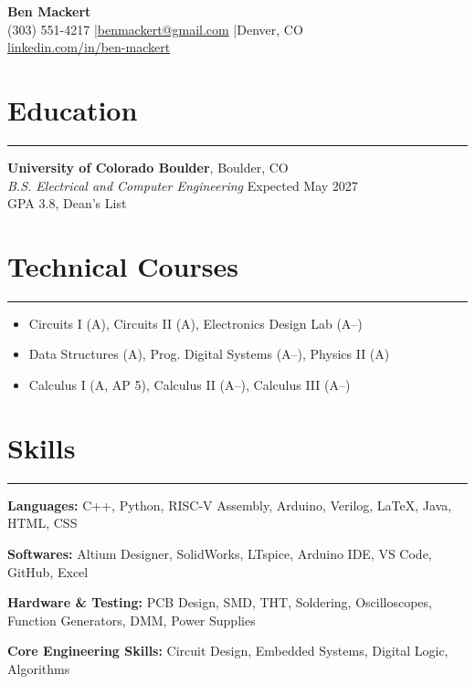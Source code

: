 \documentclass[10pt]{article}
\newcommand{\sectionline}{\vspace{0.2em}\hrule\vspace{0.4em}}
\begin{document}
\thispagestyle{empty}

\begin{center}
  {\LARGE \textbf{Ben Mackert}}\\
  (303) 551-4217 \quad|\quad \href{mailto:benmackert@gmail.com}{benmackert@gmail.com} \quad|\quad Denver, CO\\
  \href{https://www.linkedin.com/in/ben-mackert/}{linkedin.com/in/ben-mackert}
\end{center}

\section*{Education}
\sectionline

\textbf{University of Colorado Boulder}, Boulder, CO\\
\textit{B.S. Electrical and Computer Engineering} \hfill Expected May 2027\\
GPA 3.8, Dean’s List

\section*{Technical Courses}
\sectionline

\begin{itemize}[leftmargin=*]
  \item Circuits I (A), Circuits II (A), Electronics Design Lab (A–)
  \item Data Structures (A), Prog. Digital Systems (A–), Physics II (A)
  \item Calculus I (A, AP 5), Calculus II (A–), Calculus III (A–)
\end{itemize}


\section*{Skills}
\sectionline

\textbf{Languages:} C++, Python, RISC-V Assembly, Arduino, Verilog, LaTeX, Java, HTML, CSS

\textbf{Softwares:} Altium Designer, SolidWorks, LTspice, Arduino IDE, VS Code, GitHub, Excel

\textbf{Hardware \& Testing:} PCB Design, SMD, THT, Soldering, Oscilloscopes, Function Generators, DMM, Power Supplies

\textbf{Core Engineering Skills:} Circuit Design, Embedded Systems, Digital Logic, Algorithms
\end{document}
